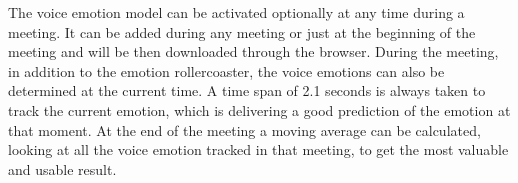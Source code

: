 The voice emotion model can be activated optionally at any time during a meeting. It can be added during any meeting or just at the beginning of the meeting and will be then downloaded through the browser. During the meeting, in addition to the emotion rollercoaster, the voice emotions can also be determined at the current time. A time span of 2.1 seconds is always taken to track the current emotion, which is delivering a good prediction of the emotion at that moment. At the end of the meeting a moving average can be calculated, looking at all the voice emotion tracked in that meeting, to get the most valuable and usable result.  
